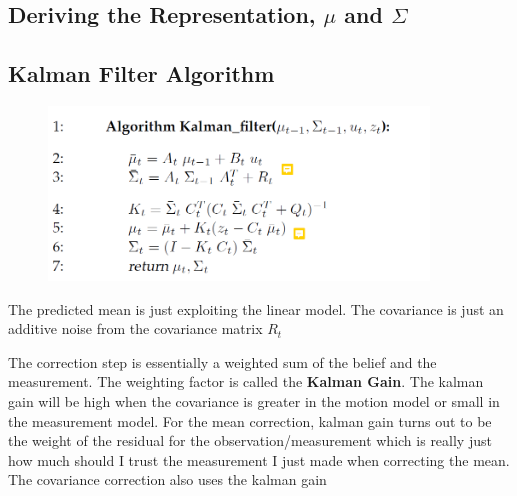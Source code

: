\documentclass[a4paper]{article}
\begin{document}
\subsection{Deriving the Representation, $\mu$ and $\Sigma$}

\subsection{Kalman Filter Algorithm}
\begin{figure}
    \includegraphics[width=0.9\textwidth]{KalmanAlgo.PNG}
\end{figure}

The predicted mean is just exploiting the linear model. The covariance is just an additive noise from the covariance matrix $R_t$

The correction step is essentially a weighted sum of the belief and the measurement. The weighting factor is called the \textbf{Kalman Gain}. The kalman gain will be high when the covariance is greater in the motion model or small in the measurement model. For the mean correction, kalman gain turns out to be the weight of the residual for the observation/measurement which is really just how much should I trust the measurement I just made when correcting the mean. The covariance correction also uses the kalman gain
\end{document}
